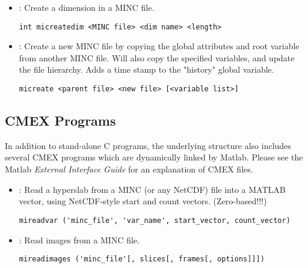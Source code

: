 \begin {itemize}
\item {} : Create a dimension in a MINC file.
\begin{verbatim}
int micreatedim <MINC file> <dim name> <length>
\end{verbatim}


\item {} : Create a new MINC file by copying the global attributes
    and root variable from another MINC file.  Will also copy 
    the specified variables, and update the file hierarchy.  Adds 
    a time stamp to the "history" global variable.
\begin{verbatim}
micreate <parent file> <new file> [<variable list>]
\end{verbatim}

\end{itemize}


\subsection{CMEX Programs}

In addition to stand-alone C programs, the underlying structure also includes
several CMEX programs which are dynamically linked by Matlab.  Please see the
Matlab {\em External Interface Guide} for an explanation of CMEX files.

\begin{itemize}

\item {} : Read a hyperslab from a MINC (or any NetCDF) file into a MATLAB
    vector, using NetCDF-style start and count vectors.  (Zero-based!!!)  
\begin{verbatim}
mireadvar ('minc_file', 'var_name', start_vector, count_vector)
\end{verbatim}

\item {} : Read images from a MINC file.
\begin{verbatim}
mireadimages ('minc_file'[, slices[, frames[, options]]]) 
\end{verbatim}

\end{itemize}





